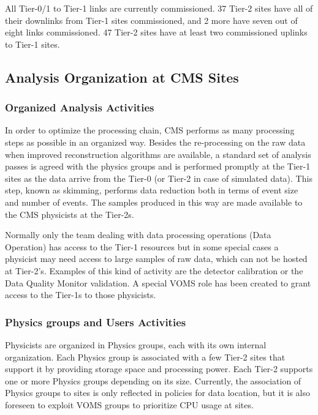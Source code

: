 All Tier-0/1 to Tier-1 links are currently commissioned. 37 Tier-2 sites have
all of their downlinks from Tier-1 sites commissioned, and 2 more have seven out
of eight links commissioned. 47 Tier-2 sites have at least two commissioned
uplinks to Tier-1 sites.

\subsection{Analysis Organization at CMS Sites}
\label{sec:4_3}
\subsubsection{ Organized Analysis Activities }
\label{sec:4_3_1}
In order to optimize the processing chain, CMS performs as many processing
steps as possible in an organized way. 
Besides the re-processing %
on the raw data when improved reconstruction algorithms are available,
a standard set of analysis passes is agreed with the physics groups
and is performed promptly at the Tier-1 sites 
as the data arrive from the Tier-0 (or Tier-2 in case of simulated data). 
This step, known as skimming, performs data reduction both
in terms of event size and number of events. 
The samples produced in this way are made available
to the CMS physicists at the Tier-2s. %

Normally only the team dealing with data processing operations (Data Operation)
has access to the Tier-1 resources but in some special cases
a physicist may need access to large samples of raw data,
which can not be hosted at Tier-2's.
Examples of this kind of activity are the detector 
calibration or the Data Quality Monitor validation.
A special VOMS role has been created to grant access
to the Tier-1s to those physicists. 

\subsubsection{Physics groups and Users Activities}
\label{sec:4_3_2}
Physicists are organized in Physics groups, each with its own internal 
organization.
Each Physics group is associated with a few Tier-2 sites that support it by 
providing storage space and processing power.
Each Tier-2 supports one or more Physics groups depending on its size.
Currently, the association of Physics groups to sites is only reflected in policies for data location, but it is also foreseen to exploit VOMS groups to prioritize CPU usage at sites.

